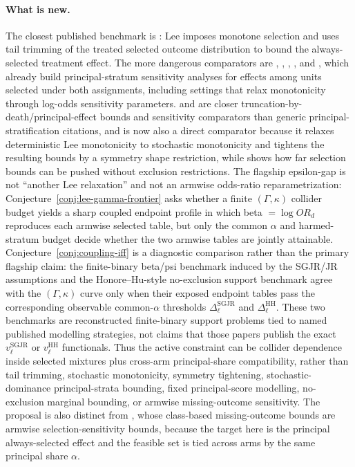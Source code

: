 \documentclass[11pt]{article}
\theoremstyle{definition}
\theoremstyle{plain}
\theoremstyle{remark}
\begin{document}
\paragraph{What is new.}
The closest published benchmark is \citet{Lee2009SampleSelection}: Lee imposes monotone selection and uses tail trimming of the treated selected outcome distribution to bound the always-selected treatment effect.  The more dangerous comparators are \citet{ShepherdGilbertJemiaiRotnitzky2006}, \citet{JemiaiRotnitzkyShepherdGilbert2007}, \citet{ShepherdRedmanAnkerst2008}, \citet{ShepherdGilbertDupont2011}, and \citet{EglestonScharfsteinFreemanWest2007}, which already build principal-stratum sensitivity analyses for effects among units selected under both assignments, including settings that relax monotonicity through log-odds sensitivity parameters.  \citet{Imai2008TruncationDeath} and \citet{Chiba2012SACE} are closer truncation-by-death/principal-effect bounds and sensitivity comparators than generic principal-stratification citations, and \citet{Okamoto2025RobustifyLee} is now also a direct comparator because it relaxes deterministic Lee monotonicity to stochastic monotonicity and tightens the resulting bounds by a symmetry shape restriction, while \citet{HonoreHu2020Selection} shows how far selection bounds can be pushed without exclusion restrictions.  The flagship epsilon-gap is not ``another Lee relaxation'' and not an armwise odds-ratio reparametrization: Conjecture~\ref{conj:lee-gamma-frontier} asks whether a finite \((\Gamma,\kappa)\) collider budget yields a sharp coupled endpoint profile in which beta \(=\log OR_d\) reproduces each armwise selected table, but only the common \(\alpha\) and harmed-stratum budget decide whether the two armwise tables are jointly attainable.  Conjecture~\ref{conj:coupling-iff} is a diagnostic comparison rather than the primary flagship claim: the finite-binary beta/psi benchmark induced by the SGJR/JR assumptions and the Honore--Hu-style no-exclusion support benchmark agree with the \((\Gamma,\kappa)\) curve only when their exposed endpoint tables pass the corresponding observable common-\(\alpha\) thresholds \(\Delta_\ell^{\mathrm{SGJR}}\) and \(\Delta_\ell^{\mathrm{HH}}\).  These two benchmarks are reconstructed finite-binary support problems tied to named published modelling strategies, not claims that those papers publish the exact \(v_\ell^{\mathrm{SGJR}}\) or \(v_\ell^{\mathrm{HH}}\) functionals.  Thus the active constraint can be collider dependence inside selected mixtures plus cross-arm principal-share compatibility, rather than tail trimming, stochastic monotonicity, symmetry tightening, stochastic-dominance principal-strata bounding, fixed principal-score modelling, no-exclusion marginal bounding, or armwise missing-outcome sensitivity.  The proposal is also distinct from \citet{ScharfsteinManskiAnthony2004Bounds}, whose class-based missing-outcome bounds are armwise selection-sensitivity bounds, because the target here is the principal always-selected effect and the feasible set is tied across arms by the same principal share \(\alpha\).
\end{document}
